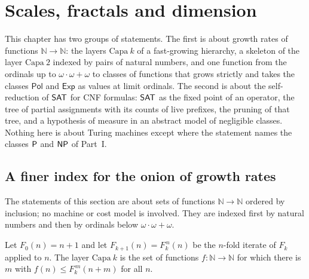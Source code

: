\chapter{Scales, fractals and dimension}
\label{chap:scales}

This chapter has two groups of statements. The first is about growth rates of functions
$\mathbb{N} \to \mathbb{N}$: the layers $\mathrm{Capa}\ k$ of a fast-growing hierarchy, a skeleton of
the layer $\mathrm{Capa}\ 2$ indexed by pairs of natural numbers, and one function from the ordinals up to
$\omega\cdot\omega+\omega$ to classes of functions that grows strictly and takes the classes
$\mathsf{Pol}$ and $\mathsf{Exp}$ as values at limit ordinals. The second is about the
self-reduction of $\mathsf{SAT}$ for CNF formulas: $\mathsf{SAT}$ as the fixed point of an operator, the tree of partial
assignments with its counts of live prefixes, the pruning of that tree, and a hypothesis of measure in an
abstract model of negligible classes. Nothing here is about Turing machines except where the statement names
the classes $\mathsf{P}$ and $\mathsf{NP}$ of Part~I.

\section{A finer index for the onion of growth rates}
\label{sec:scales-cebolla}

The statements of this section are about sets of functions $\mathbb{N}\to\mathbb{N}$ ordered by
inclusion; no machine or cost model is involved. They are indexed first by natural numbers and then by
ordinals below $\omega\cdot\omega+\omega$.

\begin{definition}
  \label{def:scales-capa}
  \leanok
  Let $F_0(n) = n+1$ and let $F_{k+1}(n) = F_k^{\,n}(n)$ be the $n$-fold iterate of $F_k$ applied to
  $n$. The layer $\mathrm{Capa}\ k$ is the set of functions $f : \mathbb{N}\to\mathbb{N}$ for which there is
  $m$ with $f(n) \le F_k^{\,m}(n+m)$ for all $n$.
  \own{}
\end{definition}

